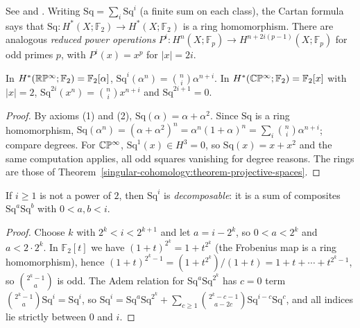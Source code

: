See \cite{steenrod-epstein} and \cite[Section 4.L]{hatcher-at}. Writing $\mathrm{Sq} = \sum_i \mathrm{Sq}^i$ (a finite sum on each class), the Cartan formula says that
$\mathrm{Sq} \colon H^*(X; \mathbb{F}_2) \to H^*(X; \mathbb{F}_2)$ is a ring homomorphism. There are analogous \emph{reduced power operations}
$P^i \colon H^n(X; \mathbb{F}_p) \to H^{n+2i(p-1)}(X; \mathbb{F}_p)$ for odd primes $p$, with $P^i(x) = x^p$ for $|x| = 2i$.

\begin{proposition}\label{cohomology-operations:proposition-squares-projective}
In $H^*(\mathbb{R}\mathbb{P}^\infty; \mathbb{F}_2) = \mathbb{F}_2[\alpha]$, $\mathrm{Sq}^i(\alpha^n) = \binom{n}{i}\alpha^{n+i}$. In $H^*(\mathbb{C}\mathbb{P}^\infty; \mathbb{F}_2) = \mathbb{F}_2[x]$ with $|x| = 2$,
$\mathrm{Sq}^{2i}(x^n) = \binom{n}{i}x^{n+i}$ and $\mathrm{Sq}^{2i+1} = 0$.
\end{proposition}

\begin{proof}
By axioms (1) and (2), $\mathrm{Sq}(\alpha) = \alpha + \alpha^2$. Since $\mathrm{Sq}$ is a ring homomorphism,
$\mathrm{Sq}(\alpha^n) = (\alpha + \alpha^2)^n = \alpha^n(1 + \alpha)^n = \sum_i \binom{n}{i}\alpha^{n+i}$; compare degrees. For $\mathbb{C}\mathbb{P}^\infty$, $\mathrm{Sq}^1(x) \in H^3 = 0$, so
$\mathrm{Sq}(x) = x + x^2$ and the same computation applies, all odd squares vanishing for degree reasons. The rings are those of
Theorem~\ref{singular-cohomology:theorem-projective-spaces}.
\end{proof}

\begin{lemma}\label{cohomology-operations:lemma-decomposable}
If $i \geq 1$ is not a power of $2$, then $\mathrm{Sq}^i$ is \emph{decomposable}: it is a sum of composites $\mathrm{Sq}^a\mathrm{Sq}^b$ with $0 < a, b < i$.
\end{lemma}

\begin{proof}
Choose $k$ with $2^k < i < 2^{k+1}$ and let $a = i - 2^k$, so $0 < a < 2^k$ and $a < 2 \cdot 2^k$. In $\mathbb{F}_2[t]$ we have $(1 + t)^{2^k} = 1 + t^{2^k}$ (the Frobenius map is a
ring homomorphism), hence $(1 + t)^{2^k - 1} = (1 + t^{2^k})/(1 + t) = 1 + t + \cdots + t^{2^k - 1}$, so $\binom{2^k - 1}{a}$ is odd. The Adem relation for $\mathrm{Sq}^a\mathrm{Sq}^{2^k}$
has $c = 0$ term $\binom{2^k - 1}{a}\mathrm{Sq}^i = \mathrm{Sq}^i$, so $\mathrm{Sq}^i = \mathrm{Sq}^a\mathrm{Sq}^{2^k} + \sum_{c \geq 1}\binom{2^k - c - 1}{a - 2c}\mathrm{Sq}^{i-c}\mathrm{Sq}^c$, and all indices
lie strictly between $0$ and $i$.
\end{proof}

